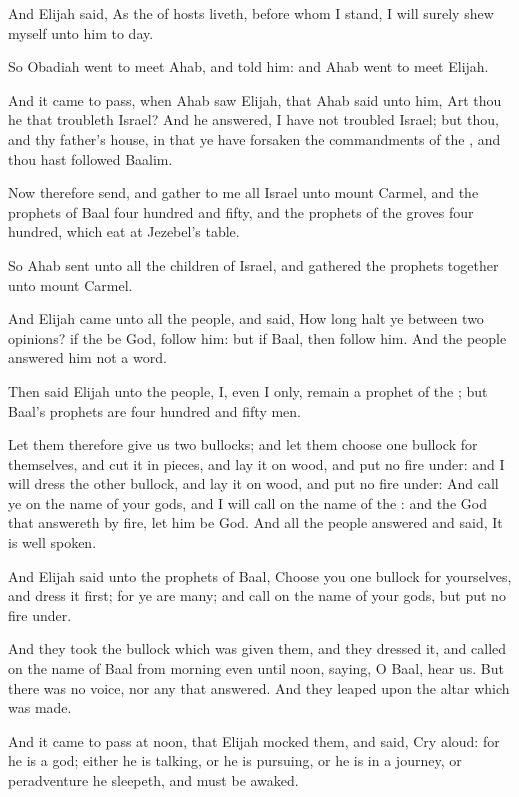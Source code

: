 \verse And Elijah said, As the \LORD of hosts liveth, before whom I stand, I will surely shew myself unto him to day.

\verse So Obadiah went to meet Ahab, and told him: and Ahab went to meet Elijah.

\verse And it came to pass, when Ahab saw Elijah, that Ahab said unto him, Art thou he that troubleth Israel?  \verse And he answered, I have not troubled Israel; but thou, and thy father's house, in that ye have forsaken the commandments of the \LORD, and thou hast followed Baalim.

\verse Now therefore send, and gather to me all Israel unto mount Carmel, and the prophets of Baal four hundred and fifty, and the prophets of the groves four hundred, which eat at Jezebel's table.

\verse So Ahab sent unto all the children of Israel, and gathered the prophets together unto mount Carmel.

\verse And Elijah came unto all the people, and said, How long halt ye between two opinions? if the \LORD be God, follow him: but if Baal, then follow him. And the people answered him not a word.

\verse Then said Elijah unto the people, I, even I only, remain a prophet of the \LORD; but Baal's prophets are four hundred and fifty men.

\verse Let them therefore give us two bullocks; and let them choose one bullock for themselves, and cut it in pieces, and lay it on wood, and put no fire under: and I will dress the other bullock, and lay it on wood, and put no fire under: \verse And call ye on the name of your gods, and I will call on the name of the \LORD: and the God that answereth by fire, let him be God. And all the people answered and said, It is well spoken.

\verse And Elijah said unto the prophets of Baal, Choose you one bullock for yourselves, and dress it first; for ye are many; and call on the name of your gods, but put no fire under.

\verse And they took the bullock which was given them, and they dressed it, and called on the name of Baal from morning even until noon, saying, O Baal, hear us. But there was no voice, nor any that answered. And they leaped upon the altar which was made.

\verse And it came to pass at noon, that Elijah mocked them, and said, Cry aloud: for he is a god; either he is talking, or he is pursuing, or he is in a journey, or peradventure he sleepeth, and must be awaked.

